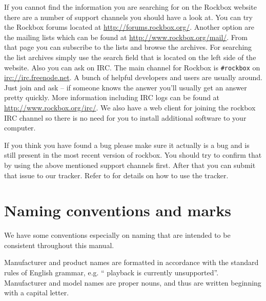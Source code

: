 If you cannot find the information you are searching for on the Rockbox
website there are a number of support channels you should have a look at.
You can try the Rockbox forums located at \url{http://forums.rockbox.org/}.
Another option are the mailing lists which can be found at
\url{http://www.rockbox.org/mail/}. From that page you can subscribe to the
lists and browse the archives. For searching the list archives simply use
the search field that is located on the left side of the website.
Also you can ask on IRC. The main channel for Rockbox is \texttt{\#rockbox}
on \url{irc://irc.freenode.net}. A bunch of helpful developers and users
are usually around. Just join and ask -- if someone knows the answer you'll
usually get an answer pretty quickly. More information including IRC logs
can be found at \url{http://www.rockbox.org/irc/}. We also have a web client
for joining the rockbox IRC channel so there is no need for you
to install additional software to your computer.

If you think you have found a bug please make sure it actually is a bug and is
still present in the most recent version of rockbox. You should try to
confirm that by using the above mentioned support channels first. After that
you can submit that issue to our tracker. Refer to 
for details on how to use the tracker.


\section{Naming conventions and marks}
We have some conventions especially on naming that are intended to be
consistent throughout this manual.

Manufacturer and product names are formatted in accordance with the standard
rules of English grammar, e.g. ``\playerman{} playback is currently
unsupported''. Manufacturer and model names are proper nouns, and
thus are written beginning with a capital letter.

